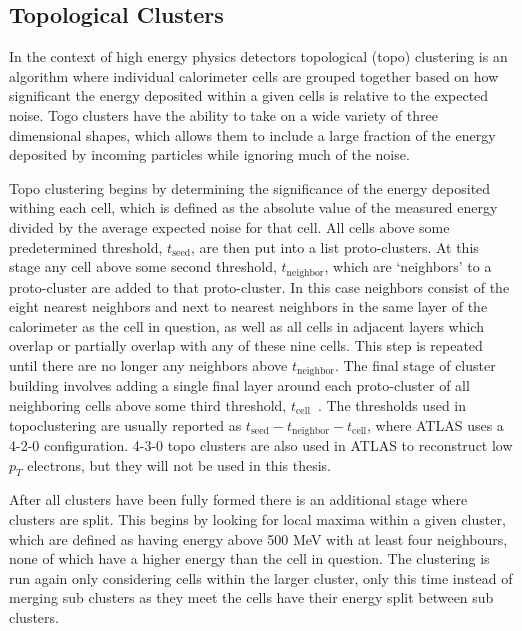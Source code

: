\subsection{Topological Clusters}

In the context of high energy physics detectors topological (topo) clustering is an algorithm where individual calorimeter cells are grouped together based on how significant the energy deposited within a given cells is relative to the expected noise.  
Togo clusters have the ability to take on a wide variety of three dimensional shapes, which allows them to include a large fraction of the energy deposited by incoming particles while ignoring much of the noise.  

Topo clustering begins by determining the significance of the energy deposited withing each cell, which is defined as the absolute value of the measured energy divided by the average expected noise for that cell.  
All cells above some predetermined threshold, $t_{\mathrm{seed}}$, are then put into a list proto-clusters.  
At this stage any cell above some second threshold, $t_{\mathrm{neighbor}}$, which are `neighbors' to a proto-cluster are added to that proto-cluster.  
In this case neighbors consist of the eight nearest neighbors and next to nearest neighbors in the same layer of the calorimeter as the cell in question, as well as all cells in adjacent layers which overlap or partially overlap with any of these nine cells.  
This step is repeated until there are no longer any neighbors above $t_{\mathrm{neighbor}}$.  
The final stage of cluster building involves adding a single final layer around each proto-cluster of all neighboring cells above some third threshold, $t_{\mathrm{cell}}$~\cite{1603.02934}.  
The thresholds used in topoclustering are usually reported as $t_{\mathrm{seed}}-t_{\mathrm{neighbor}}-t_{\mathrm{cell}}$, where ATLAS uses a 4-2-0 configuration.  
4-3-0 topo clusters are also used in ATLAS to reconstruct low $p_T$ electrons, but they will not be used in this thesis.   

After all clusters have been fully formed there is an additional stage where clusters are split.  
This begins by looking for local maxima within a given cluster, which are defined as having energy above 500 MeV with at least four neighbours, none of which have a higher energy than the cell in question.  
The clustering is run again only considering cells within the larger cluster, only this time instead of merging sub clusters as they meet the cells have their energy split between sub clusters.  
 
